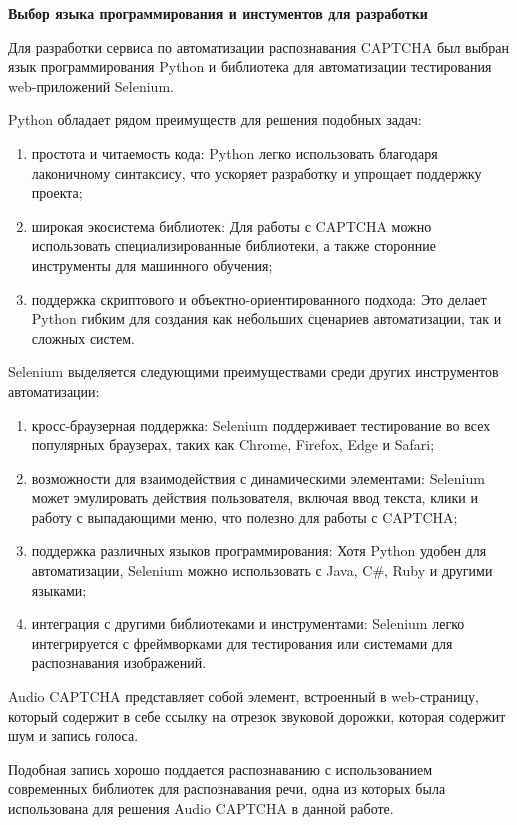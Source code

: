 \textbf{Выбор языка программирования и инстументов для разработки}

Для разработки сервиса по автоматизации распознавания CAPTCHA был выбран язык 
программирования Python и библиотека для автоматизации тестирования 
web-приложений Selenium.

Python обладает рядом преимуществ для решения подобных задач:

\begin{enumerate}
    \item простота и читаемость кода: Python легко использовать благодаря 
    лаконичному синтаксису, что ускоряет разработку и упрощает поддержку проекта;
    \item широкая экосистема библиотек: Для работы с CAPTCHA можно использовать 
    специализированные библиотеки, а также сторонние инструменты для машинного 
    обучения;
    \item поддержка скриптового и объектно-ориентированного подхода: Это делает 
    Python гибким для создания как небольших сценариев автоматизации, так и 
    сложных систем.
\end{enumerate}

Selenium выделяется следующими преимуществами среди других инструментов 
автоматизации:

\begin{enumerate}
    \item кросс-браузерная поддержка: Selenium поддерживает тестирование во всех 
    популярных браузерах, таких как Chrome, Firefox, Edge и Safari;
    \item возможности для взаимодействия с динамическими элементами: Selenium 
    может эмулировать действия пользователя, включая ввод текста, клики и работу 
    с выпадающими меню, что полезно для работы с CAPTCHA;
    \item поддержка различных языков программирования: Хотя Python удобен для 
    автоматизации, Selenium можно использовать с Java, C\#, Ruby и другими 
    языками;
    \item интеграция с другими библиотеками и инструментами: Selenium легко 
    интегрируется с фреймворками для тестирования или системами для распознавания 
    изображений.
\end{enumerate}

Audio CAPTCHA представляет собой элемент, встроенный в web-страницу, который 
содержит в себе ссылку на отрезок звуковой дорожки, которая содержит шум и запись 
голоса.

Подобная запись хорошо поддается распознаванию с использованием современных 
библиотек для распознавания речи, одна из которых была использована для решения 
Audio CAPTCHA в данной работе.

